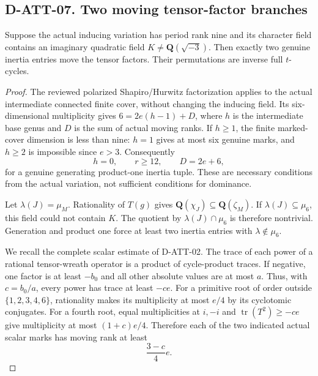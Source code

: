 \subsection*{D-ATT-07. Two moving tensor-factor branches}

\begin{lemma}[D-ATT-07]
Suppose the actual inducing variation has period rank nine and its
character field contains an imaginary quadratic field
$K\ne\mathbf Q(\sqrt{-3})$.  Then exactly two genuine inertia
entries move the tensor factors.  Their permutations are inverse
full $t$-cycles.
\end{lemma}

\begin{proof}
The reviewed polarized Shapiro/Hurwitz factorization applies to
the actual intermediate connected finite cover, without changing
the inducing field.  Its six-dimensional multiplicity gives
$6=2e(h-1)+D$, where $h$ is the intermediate base genus and
$D$ is the sum of actual moving ranks.  If $h\ge1$, the finite
marked-cover dimension is less than nine: $h=1$ gives at most six
genuine marks, and $h\ge2$ is impossible since $e>3$.
Consequently
\[
       h=0,\qquad r\ge12,\qquad D=2e+6,
 \tag{ATX.5}
\]
for a genuine generating product-one inertia tuple.  These are
necessary conditions from the actual variation, not sufficient
conditions for dominance.

Let $\lambda(J)=\mu_M$.  Rationality of $T(g)$ gives
$\mathbf Q(\chi_J)\subseteq\mathbf Q(\zeta_M)$.  If
$\lambda(J)\subseteq\mu_6$, this field could not contain $K$.
The quotient by $\lambda(J)\cap\mu_6$ is therefore nontrivial.
Generation and product one force at least two inertia entries with
$\lambda\notin\mu_6$.

We recall the complete scalar estimate of D-ATT-02.  The trace of
each power of a rational tensor-wreath operator is a product of
cycle-product traces.  If negative, one factor is at least $-b_0$
and all other absolute values are at most $a$.  Thus, with
$c=b_0/a$, every power has trace at least $-ce$.
For a primitive root of order outside $\{1,2,3,4,6\}$, rationality
makes its multiplicity at most $e/4$ by its cyclotomic conjugates.
For a fourth root, equal multiplicities at $i,-i$ and
$\operatorname{tr}(T^2)\ge-ce$ give multiplicity at most
$(1+c)e/4$.  Therefore each of the two indicated actual scalar
marks has moving rank at least
\[
                         \frac{3-c}{4}e.
 \tag{ATX.6}
\]


\end{proof}
